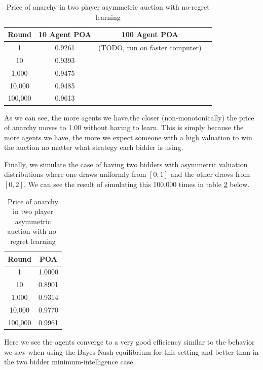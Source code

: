 \documentclass[12pt,twoside]{reedthesis}
\begin{document}
\begin{table}[h!]
	\begin{center}
		\begin{tabular}{ |c|c|c|c| }
			\hline
			Round & 10 Agent POA & 100 Agent POA\\
			\hline
			1 & 0.9261 & (TODO, run on faster computer)\\
			10 & 0.9393 & \\
			1,000 & 0.9475 & \\
			10,000 & 0.9485 &\\
			100,000 & 0.9613 & \\
			\hline
		\end{tabular}
		\caption{Price of anarchy in two player asymmetric auction with no-regret learning}
		\label{table:4}
	\end{center} 
\end{table}

As we can see, the more agents we have,the closer (non-monotonically) the price of anarchy moves to 1.00 without having to learn. This is simply because the more agents we have, the more we expect someone with a high valuation to win the auction no matter what strategy each bidder is using.

Finally, we simulate the case of having two bidders with asymmetric valuation distributions where one draws uniformly from $[0,1]$ and the other draws from $[0,2]$. We can see the result of simulating this 100,000 times in table \ref{table:5} below.

\begin{table}[h!]
	\begin{center}
		\begin{tabular}{ |c|c| }
			\hline
			Round & POA \\
			\hline
			1 & 1.0000 \\
			10 & 0.8901 \\
			1,000 & 0.9314 \\
			10,000 & 0.9770 \\
			100,000 & 0.9961 \\
			\hline
		\end{tabular}
		\caption{Price of anarchy in two player asymmetric auction with no-regret learning}
		\label{table:5}
	\end{center} 
\end{table}

Here we see the agents converge to a very good efficiency similar to the behavior we saw when using the Bayes-Nash equilibrium for this setting and better than in the two bidder minimum-intelligence case.
\end{document}
